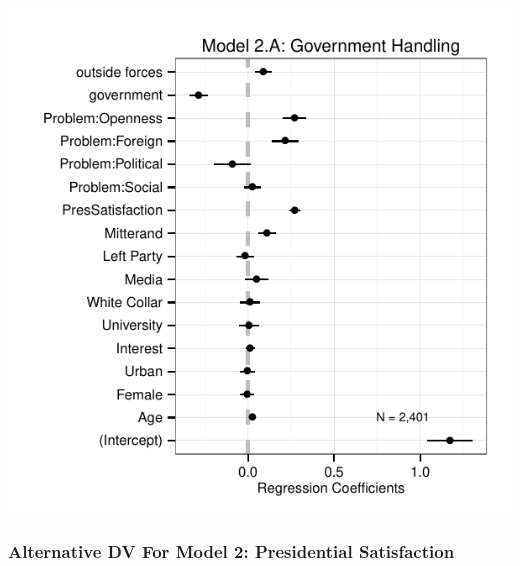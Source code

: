 \documentclass[12pt]{report}
\begin{document}
\begin{center}
\includegraphics{article1_govhandling_altcause_coefs}
\par\end{center}

\pagebreak

\begin{center}

\par\end{center}

\pagebreak

\subsubsection*{Alternative DV For Model 2: Presidential Satisfaction}
\end{document}

